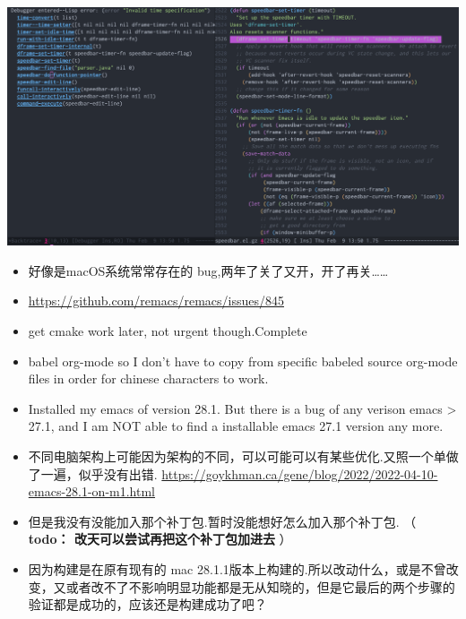 \documentclass[9pt, b5paper]{article}
\begin{document}
\begin{center}
\includegraphics[width=.9\linewidth]{./pic/readme_20230209_135039.png}
\end{center}
\begin{itemize}
\item 好像是macOS系统常常存在的 bug,两年了关了又开，开了再关\ldots{}\ldots{}
\item \url{https://github.com/remacs/remacs/issues/845}
\item get cmake work later, not urgent though.Complete
\item babel org-mode so I don't have to copy from specific babeled source org-mode files in order for chinese characters to work.
\item Installed my emacs of version 28.1. But there is a bug of any verison emacs > 27.1, and I am NOT able to find a installable emacs 27.1 version any more.
\item 不同电脑架构上可能因为架构的不同，可以可能可以有某些优化.又照一个单做了一遍，似乎没有出错. \url{https://goykhman.ca/gene/blog/2022/2022-04-10-emacs-28.1-on-m1.html}
\item 但是我没有没能加入那个补丁包.暂时没能想好怎么加入那个补丁包. （ \textbf{todo： 改天可以尝试再把这个补丁包加进去} ）
\item 因为构建是在原有现有的 mac 28.1.1版本上构建的.所以改动什么，或是不曾改变，又或者改不了不影响明显功能都是无从知晓的，但是它最后的两个步骤的验证都是成功的，应该还是构建成功了吧？
\end{itemize}
\end{document}
